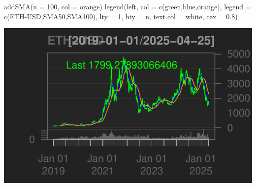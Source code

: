 \documentclass[]{tufte-handout}
\newenvironment{Shaded}{}{}
\newcommand{\AttributeTok}[1]{\textcolor[rgb]{0.49,0.56,0.16}{#1}}
\newcommand{\DecValTok}[1]{\textcolor[rgb]{0.25,0.63,0.44}{#1}}
\newcommand{\FloatTok}[1]{\textcolor[rgb]{0.25,0.63,0.44}{#1}}
\newcommand{\FunctionTok}[1]{\textcolor[rgb]{0.02,0.16,0.49}{#1}}
\newcommand{\NormalTok}[1]{#1}
\newcommand{\OtherTok}[1]{\textcolor[rgb]{0.00,0.44,0.13}{#1}}
\newcommand{\SpecialCharTok}[1]{\textcolor[rgb]{0.25,0.44,0.63}{#1}}
\newcommand{\StringTok}[1]{\textcolor[rgb]{0.25,0.44,0.63}{#1}}
\begin{document}
\begin{Shaded}
\begin{Highlighting}[]
\FunctionTok{addSMA}\NormalTok{(}\AttributeTok{n =} \DecValTok{100}\NormalTok{, }\AttributeTok{col =} \StringTok{\textquotesingle{}orange\textquotesingle{}}\NormalTok{)}
\FunctionTok{legend}\NormalTok{(}\StringTok{\textquotesingle{}left\textquotesingle{}}\NormalTok{, }\AttributeTok{col =} \FunctionTok{c}\NormalTok{(}\StringTok{\textquotesingle{}green\textquotesingle{}}\NormalTok{,}\StringTok{\textquotesingle{}blue\textquotesingle{}}\NormalTok{,}\StringTok{\textquotesingle{}orange\textquotesingle{}}\NormalTok{),}
       \AttributeTok{legend =} \FunctionTok{c}\NormalTok{(}\StringTok{\textquotesingle{}ETH{-}USD\textquotesingle{}}\NormalTok{,}\StringTok{\textquotesingle{}SMA50\textquotesingle{}}\NormalTok{,}\StringTok{\textquotesingle{}SMA100\textquotesingle{}}\NormalTok{), }\AttributeTok{lty =} \DecValTok{1}\NormalTok{, }\AttributeTok{bty =} \StringTok{\textquotesingle{}n\textquotesingle{}}\NormalTok{,}
       \AttributeTok{text.col =} \StringTok{\textquotesingle{}white\textquotesingle{}}\NormalTok{, }\AttributeTok{cex =} \FloatTok{0.8}\NormalTok{)}
\end{Highlighting}
\end{Shaded}

\includegraphics{cripto_update_files/figure-latex/unnamed-chunk-6-3}

\begin{Shaded}
\end{Shaded}
\end{document}
